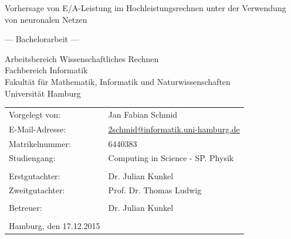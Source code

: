 \documentclass[
	12pt,
	a4paper,
	BCOR10mm,
	DIV14,
	listof=totoc,
	bibliography=totoc,
	headsepline
]{scrreprt}
\begin{document}
	

\begin{titlepage}
	\begin{center}
		{\titlefont\huge Vorhersage von E/A-Leistung im Hochleistungsrechnen unter der Verwendung von neuronalen Netzen\par}

		\bigskip
		\bigskip

		{\titlefont\Large --- Bachelorarbeit ---\par}

		\bigskip
		\bigskip

		{\large Arbeitsbereich Wissenschaftliches Rechnen\\
		Fachbereich Informatik\\
		Fakultät für Mathematik, Informatik und Naturwissenschaften\\
		Universität Hamburg\par}
	\end{center}

	\vfill

	{\large \begin{tabular}{ll}
		Vorgelegt von: & Jan Fabian Schmid \\
		E-Mail-Adresse: & \href{mailto:2schmid@informatik.uni-hamburg.de}{2schmid@informatik.uni-hamburg.de} \\
		Matrikelnummer: & 6440383 \\
		Studiengang: & Computing in Science - SP. Physik \\
		\\
		Erstgutachter: & Dr. Julian Kunkel \\
		Zweitgutachter: & Prof. Dr. Thomas Ludwig\\ \\
		Betreuer: & Dr. Julian Kunkel \\
		\\
		Hamburg, den 17.12.2015
	\end{tabular}\par}
\end{titlepage}

\mbox{}
\thispagestyle{empty}
\newpage
\end{document}
